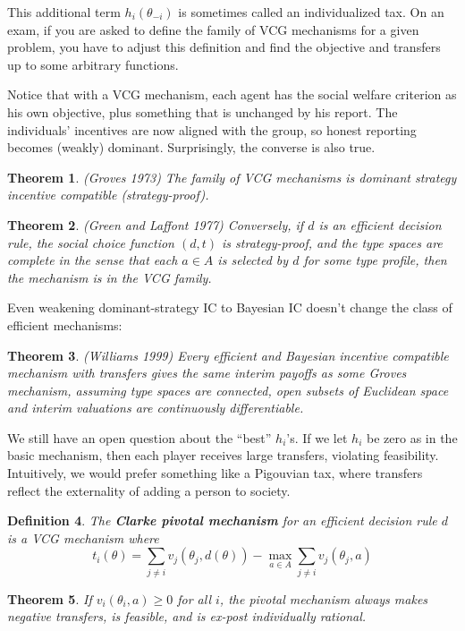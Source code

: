 \documentclass[letter, 10pt]{article}
\newtheorem{theorem}{Theorem}[section]
\newtheorem{definition}[theorem]{Definition}
\theoremstyle{definition}
\begin{document}
\begin{spacing}{1.1}
This additional term $h_i(\theta_{-i})$ is sometimes called an
individualized tax. On an exam, if you are asked to define the family of
VCG mechanisms for a given problem, you have to adjust this definition and
find the objective and transfers up to some arbitrary functions.

Notice that with a VCG mechanism, each agent has the social welfare
criterion as his own objective, plus something that is unchanged by his
report. The individuals' incentives are now aligned with the group, so
honest reporting becomes (weakly) dominant. Surprisingly, the converse is
also true.
\begin{theorem}
  (Groves 1973) The family of VCG mechanisms is dominant strategy incentive
  compatible (strategy-proof).
\end{theorem}
\begin{theorem}
  (Green and Laffont 1977) Conversely, if $d$ is an efficient decision
  rule, the social choice function $(d,t)$ is strategy-proof, and the type
  spaces are complete in the sense that each $a \in A$ is selected by $d$
  for some type profile, then the mechanism is in the VCG family.
\end{theorem}
Even weakening dominant-strategy IC to Bayesian IC doesn't change the class
of efficient mechanisms:
\begin{theorem}
  (Williams 1999) Every efficient and Bayesian incentive compatible
  mechanism with transfers gives the same interim payoffs as some Groves
  mechanism, assuming type spaces are connected, open subsets of Euclidean
  space and interim valuations are continuously differentiable.
\end{theorem}

We still have an open question about the ``best'' $h_i$'s. If we let $h_i$
be zero as in the basic mechanism, then each player receives large
transfers, violating feasibility. Intuitively, we would prefer something
like a Pigouvian tax, where transfers reflect the externality of adding a
person to society.

\begin{definition}
  The \textbf{Clarke pivotal mechanism} for an efficient decision rule $d$
  is a VCG mechanism where \[t_i(\theta) = \sum_{j \neq i} v_j(\theta_j,
  d(\theta)) - \max_{a\in A} \sum_{j\neq i} v_j(\theta_j, a)\]
\end{definition}

\begin{theorem}
  If $v_i(\theta_i,a)\geq 0$ for all $i$, the pivotal mechanism always
  makes negative transfers, is feasible, and is ex-post individually
  rational.
\end{theorem}


\end{spacing}
\end{document}
